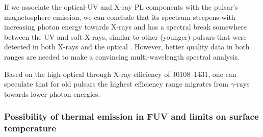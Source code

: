 \documentclass[pdftex,twocolumn]{aastex62}
\newcommand{\yus}[1]{{\color[rgb]{0.5,0.1,0.5}YS: #1}}
\newcommand{\gp}[1]{{\color{blue} #1}}
\begin{document}
  If we associate the optical-UV and X-ray PL components with the pulsar's magnetosphere emission, we can conclude that its spectrum steepens with increasing photon energy towards X-rays and  
  has a spectral break somewhere between the UV and soft X-rays,
  similar to other (younger) pulsars that were detected in both X-rays and the optical \citep[e.g.,][]{Kargaltsev2007}. 
  However,  better quality data in both ranges are needed to make a convincing multi-wavelength spectral analysis.  
  
  Based on the high optical through X-ray efficiency of J0108--1431, one can speculate 
  that for old pulsars the highest efficiency range 
  migrates from $\gamma$-rays towards lower photon energies. 
 
  
  
  

  
  \subsubsection{Possibility of thermal emission in FUV and limits on surface temperature}
  
\end{document}
